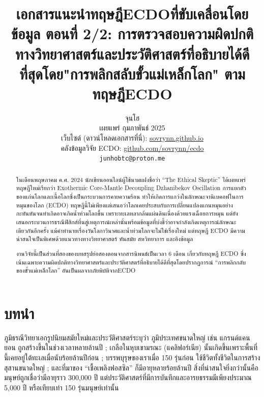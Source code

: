 \documentclass[10pt,twocolumn,letterpaper]{article}
\begin{document}
\title{เอกสารแนะนำทฤษฎีECDOที่ขับเคลื่อนโดยข้อมูล ตอนที่ 2/2: การตรวจสอบความผิดปกติทางวิทยาศาสตร์และประวัติศาสตร์ที่อธิบายได้ดีที่สุดโดย"การพลิกสลับขั้วแม่เหล็กโลก" ตามทฤษฎีECDO}

\author{จุนโฮ\\
เผยแพร่ กุมภาพันธ์ 2025\\
เว็บไซต์ (ดาวน์โหลดเอกสารที่นี่): \href{https://sovrynn.github.io}{sovrynn.github.io}\\
คลังข้อมูลวิจัย ECDO: \href{https://github.com/sovrynn/ecdo}{github.com/sovrynn/ecdo}\\
{\tt\small junhobtc@proton.me}
}

\maketitle

\begin{abstract}
ในเดือนพฤษภาคม ค.ศ. 2024 นักเขียนออนไลน์ผู้ใช้นามแฝงชื่อว่า “The Ethical Skeptic” \cite{0} ได้เผยแพร่ทฤษฎีใหม่เรียกว่า Exothermic Core-Mantle Decoupling Dzhanibekov Oscillation การแยกตัวของแก่นโลกและเนื้อโลกซึ่งเป็นกระบวนการคายความร้อน ทำให้เกิดการแกว่งในลักษณะจานิเบคอฟในการหมุนของโลก (ECDO) \cite{1} ทฤษฎีนี้ไม่เพียงแต่เสนอว่าโลกเคยประสบกับการเปลี่ยนแปลงแกนหมุนอย่างกะทันหันจนทำเกิดอาจเกิดน้ำท่วมโลกขึ้น เพราะทะเลหลากล้นแผ่นดินเนื่องด้วยแรงเฉื่อยการหมุน แต่ยังเสนอกระบวนการธรณีฟิสิกส์ที่นสู่เหตุการณ์เหล่านั้นพร้อมข้อมูลที่บ่งชี้ว่าอาจกำลังเกิดเหตุการณ์ลักษณะเดียวกันอีกครั้ง แม้คำทำนายเรื่องวันโลกาวินาศและน้ำท่วมโลกจะไม่ใช่เรื่องใหม่ แต่ทฤษฎี ECDO มีความน่าสนใจเป็นพิเศษด้วยแนวทางทางวิทยาศาสตร์ ทันสมัย สหวิทยาการ และอิงข้อมูล

งานวิจัยนี้เป็นส่วนที่สองของบทสรุปย่อสองตอนจากสารนิพนธ์เป็นเวลา 6 เดือน \cite{2,20} เกี่ยวกับทฤษฎี ECDO ซึ่งเน้นเฉพาะความผิดปกติทางวิทยาศาสตร์และประวัติศาสตร์ที่อธิบายได้ดีที่สุดโดยปรากฏการณ์ “การพลิกกลับของขั้วแม่เหล็กโลก” อันเป็นผลจากภัยพิบัติจากECDO
\end{abstract}

\section{บทนำ}

ภูมิธรณีวิทยาเอกรูปนิยมสมัยใหม่และประวัติศาสตร์ระบุว่า ภูมิประเทศขนาดใหญ่ เช่น แกรนด์แคนยอน ถูกสร้างขึ้นในช่วงเวลาหลายล้านปี \cite{143}; เกลือในหุบเขามรณะ (แคลิฟอร์เนีย) นั้นเกิดขึ้นเพราะพื้นที่นี้เคยอยู่ใต้ทะเลเมื่อนับร้อยล้านปีก่อน \cite{144}; บรรพบุรุษของเราเมื่อ 150 รุ่นก่อน ใช้ชีวิตทั้งชีวิตในการสร้างสุสานขนาดใหญ่ \cite{29,70}; และที่มาของ “เชื้อเพลิงฟอสซิล” ก็มีอายุหลายร้อยล้านปี \cite{104} สิ่งที่น่าสนใจยิ่งกว่านั้นคือมนุษย์ถูกเชื่อว่ามีอายุราว 300,000 ปี \cite{145} แต่ประวัติศาสตร์ที่มีการบันทึกและอารยธรรมมีเพียงประมาณ 5,000 ปี หรือเทียบเท่า 150 รุ่นมนุษย์เท่านั้น
\end{document}
